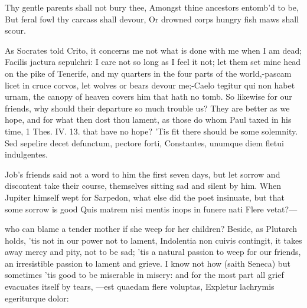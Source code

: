 {Thy gentle parents shall not bury thee,
Amongst thine ancestors entomb'd to be,
But feral fowl thy carcass shall devour,
Or drowned corps hungry fish maws shall scour.

As Socrates told Crito, it concerns me not what is done with me when I
am dead; Facilis jactura sepulchri: I care not so long as I feel it
not; let them set mine head on the pike of Tenerife, and my quarters in
the four parts of the world,-pascam licet in cruce corvos, let wolves
or bears devour me;-Caelo tegitur qui non habet urnam, the canopy
of heaven covers him that hath no tomb. So likewise for our friends,
why should their departure so much trouble us? They are better as we
hope, and for what then dost thou lament, as those do whom Paul taxed
in his time, 1 Thes. IV. 13. that have no hope? 'Tis fit there should
be some solemnity.
Sed sepelire decet defunctum, pectore forti,
Constantes, unumque diem fletui indulgentes.

Job's friends said not a word to him the first seven days, but let
sorrow and discontent take their course, themselves sitting sad and
silent by him. When Jupiter himself wept for Sarpedon, what else did
the poet insinuate, but that some sorrow is good
Quis matrem nisi mentis inops in funere nati
Flere vetat?---

who can blame a tender mother if she weep for her children? Beside, as
Plutarch holds, 'tis not in our power not to lament, Indolentia
non cuivis contingit, it takes away mercy and pity, not to be sad; 'tis
a natural passion to weep for our friends, an irresistible passion to
lament and grieve. I know not how (saith Seneca) but sometimes 'tis
good to be miserable in misery: and for the most part all grief
evacuates itself by tears,
---est quaedam flere voluptas,
Expletur lachrymis egeriturque dolor:

}
